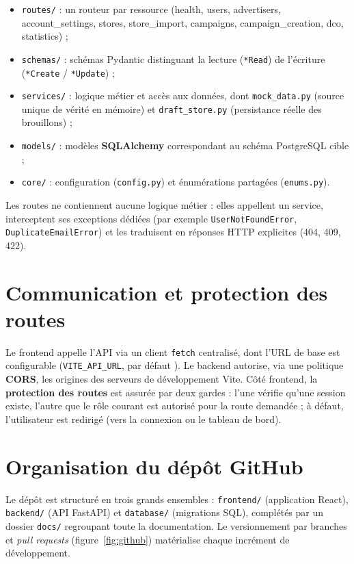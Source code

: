 \begin{itemize}
  \item \texttt{routes/} : un routeur par ressource (health, users,
        advertisers, account\_settings, stores, store\_import, campaigns,
        campaign\_creation, dco, statistics) ;
  \item \texttt{schemas/} : schémas Pydantic distinguant la lecture
        (\texttt{*Read}) de l'écriture (\texttt{*Create} / \texttt{*Update}) ;
  \item \texttt{services/} : logique métier et accès aux données, dont
        \texttt{mock\_data.py} (source unique de vérité en mémoire) et
        \texttt{draft\_store.py} (persistance réelle des brouillons) ;
  \item \texttt{models/} : modèles \textbf{SQLAlchemy} correspondant au schéma
        PostgreSQL cible ;
  \item \texttt{core/} : configuration (\texttt{config.py}) et énumérations
        partagées (\texttt{enums.py}).
\end{itemize}

Les routes ne contiennent aucune logique métier : elles appellent un service,
interceptent ses exceptions dédiées (par exemple \texttt{UserNotFoundError},
\texttt{DuplicateEmailError}) et les traduisent en réponses HTTP explicites
(404, 409, 422).

\section{Communication et protection des routes}

Le frontend appelle l'API via un client \texttt{fetch} centralisé, dont l'URL
de base est configurable (\texttt{VITE\_API\_URL}, par défaut
). Le backend autorise, via une politique
\textbf{CORS}, les origines des serveurs de développement Vite. Côté frontend,
la \textbf{protection des routes} est assurée par deux gardes : l'une vérifie
qu'une session existe, l'autre que le rôle courant est autorisé pour la route
demandée ; à défaut, l'utilisateur est redirigé (vers la connexion ou le
tableau de bord).

\section{Organisation du dépôt GitHub}

Le dépôt est structuré en trois grands ensembles : \texttt{frontend/}
(application React), \texttt{backend/} (API FastAPI) et \texttt{database/}
(migrations SQL), complétés par un dossier \texttt{docs/} regroupant toute la
documentation. Le versionnement par branches et \emph{pull requests}
(figure~\ref{fig:github}) matérialise chaque incrément de développement.
